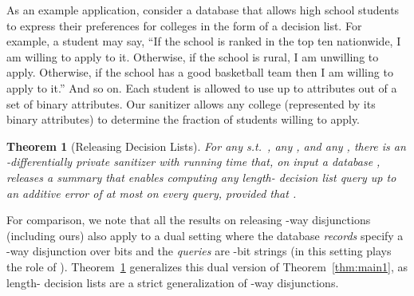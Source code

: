 \documentclass[11pt]{article}
\newtheorem{theorem}{Theorem}[section]
\theoremstyle{definition}
\begin{document}
As an example application, consider a database that allows high school students to
express their preferences for colleges in the form of a decision list.
For example, a student may say, ``If the school is ranked in the top
ten nationwide, I am willing to apply to it. Otherwise, if the school is 
rural, I am unwilling to apply. Otherwise, if the school has a good
basketball team then I am willing to apply to it.'' And so on. Each student is allowed to use up to  attributes out of a set of  binary attributes.  Our sanitizer allows any college (represented by its  binary attributes) to determine the fraction of students willing to apply. 

\begin{theorem}[Releasing Decision Lists] \label{thm:main3}
For any  s.t.~, any , and any , there is an -differentially private sanitizer with running time  that, on input a database , releases a summary that enables computing any length- decision list query up to an additive error of at most  on every query, provided that .
\end{theorem}

For comparison, we note that all the results on releasing -way disjunctions (including ours) also apply to a dual setting where the database \emph{records} specify a -way disjunction over  bits and the \emph{queries} are -bit strings (in this setting  plays the role of ).  Theorem~\ref{thm:main3} generalizes this dual version of Theorem~\ref{thm:main1}, as length- decision lists are a strict generalization of -way disjunctions.
\end{document}
